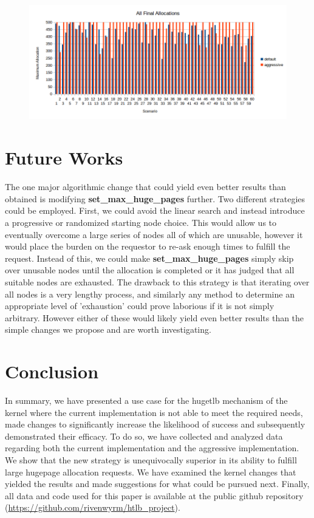 \documentclass{article}
\begin{document}
\begin{figure}[H]
	\includegraphics[width=\linewidth]{./datums/final_allocs.png}
	\label{fig:final_allocs}
\end{figure}

\section{Future Works}
The one major algorithmic change that could yield even better results than obtained is modifying \textbf{set\_max\_huge\_pages} further. Two different strategies could be employed. First, we could avoid the linear search and instead introduce a progressive or randomized starting node choice. This would allow us to eventually overcome a large series of nodes all of which are unusable, however it would place the burden on the requestor to re-ask enough times to fulfill the request. Instead of this, we could make \textbf{set\_max\_huge\_pages} simply skip over unusable nodes until the allocation is completed or it has judged that all suitable nodes are exhausted. The drawback to this strategy is that iterating over all nodes is a very lengthy process, and similarly any method to determine an appropriate level of 'exhaustion' could prove laborious if it is not simply arbitrary. However either of these would likely yield even better results than the simple changes we propose and are worth investigating.

\section{Conclusion}
In summary, we have presented a use case for the hugetlb mechanism of the kernel where the current implementation is not able to meet the required needs, made changes to significantly increase the likelihood of success and subsequently demonstrated their efficacy. To do so, we have collected and analyzed data regarding both the current implementation and the aggressive implementation. We show that the new strategy is unequivocally superior in its ability to fulfill large hugepage allocation requests. We have examined the kernel changes that yielded the results and made suggestions for what could be pursued next. Finally, all data and code used for this paper is available at the public github repository (\url{https://github.com/rivenwyrm/htlb_project}).
\end{document}
